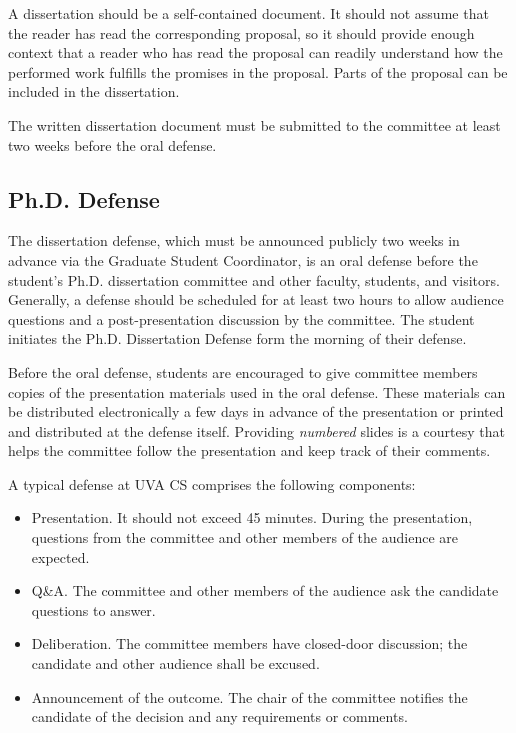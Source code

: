 A dissertation should be a self-contained document. It should not assume
that the reader has read the corresponding proposal, so it should
provide enough context that a reader who has read the proposal can
readily understand how the performed work fulfills the promises in the
proposal. Parts of the proposal can be included in the dissertation.

The written dissertation document must be submitted to the committee at
least two weeks before the oral defense.

\hypertarget{phd-defense}{
\subsection{Ph.D. Defense}
\label{phd-defense}
}

The dissertation defense, which must be announced publicly two weeks in
advance via the Graduate Student Coordinator, is an oral defense before
the student's Ph.D. dissertation committee and other faculty, students,
and visitors. Generally, a defense should be scheduled for at least two
hours to allow audience questions and a post-presentation discussion
by the committee. The student initiates the Ph.D. Dissertation Defense form the morning of their defense.

Before the oral defense, students are encouraged to give committee members
copies of the presentation materials used in the oral defense. These
materials can be distributed electronically a few days in advance of
the presentation or printed and distributed at the defense itself.
Providing \emph{numbered} slides is a courtesy that helps the committee
follow the presentation and keep track of their comments.

A typical defense at UVA CS comprises the following components:

\begin{itemize}[nosep]
\item
  Presentation. It should not exceed 45 minutes. During the presentation, questions from the committee and other members of the audience are expected.
\item
  Q\&A. The committee and other members of the audience ask the candidate questions to answer.
\item
  Deliberation. The committee members have closed-door discussion; the candidate and other audience shall be excused.
\item
  Announcement of the outcome. The chair of the committee notifies the candidate of the decision and any requirements or comments.
\end{itemize}


